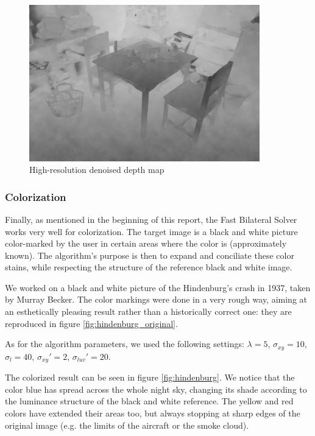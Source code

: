 \documentclass{article}
\begin{document}
\begin{figure}
    \centering
    \includegraphics[width=10cm]{pictures/depth_superresolution_room_new.png}
    \caption{High-resolution denoised depth map}
    \label{fig:room}
\end{figure}

\subsubsection{Colorization}

Finally, as mentioned in the beginning of this report, the Fast Bilateral Solver works very well for colorization. The target image is a black and white picture color-marked by the user in certain areas where the color is (approximately known). The algorithm's purpose is then to expand and conciliate these color stains, while respecting the structure of the reference black and white image.

\medskip

We worked on a black and white picture of the Hindenburg's crash in 1937, taken by Murray Becker. The color markings were done in a very rough way, aiming at an esthetically pleasing result rather than a historically correct one: they are reproduced in figure \ref{fig:hindenburg_original}.

As for the algorithm parameters, we used the following settings: $\lambda = 5$, $\sigma_{xy} = 10$, $\sigma_l = 40$, $\sigma_{xy}' = 2$, $\sigma_{luv}' = 20$. 

\medskip

The colorized result can be seen in figure \ref{fig:hindenburg}. We notice that the color blue has spread across the whole night sky, changing its shade according to the luminance structure of the black and white reference. The yellow and red colors have extended their areas too, but always stopping at sharp edges of the original image (e.g. the limits of the aircraft or the smoke cloud).
\end{document}
